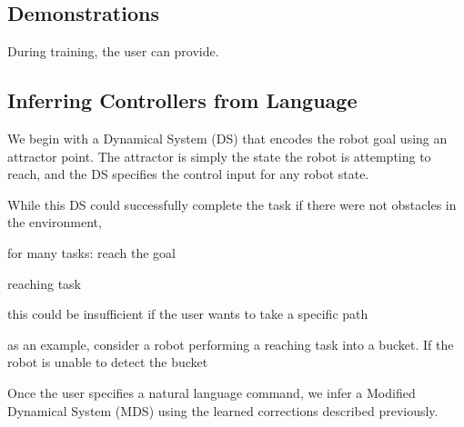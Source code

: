 \subsection{Demonstrations}

During training, the user can provide.



\subsection{Inferring Controllers from Language}

We begin with a Dynamical System (DS) that encodes the robot goal using an attractor point.
The attractor is simply the state the robot is attempting to reach, and the DS specifies the control input for any robot state.

While this DS could successfully complete the task if there were not obstacles in the environment,


for many tasks: reach the goal

reaching task


this could be insufficient if the user wants to take a specific path


as an example, consider a robot performing a reaching task into a bucket.
If the robot is unable to detect the bucket




Once the user specifies a natural language command, we infer a Modified Dynamical System (MDS) using the learned corrections described previously.


